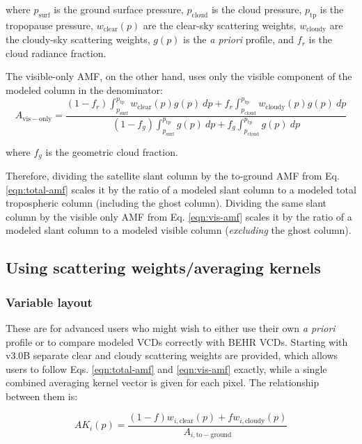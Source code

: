 \documentclass[12pt]{article}
\begin{document}
	where $p_{\mathrm{surf}}$ is the ground surface pressure, $p_{\mathrm{cloud}}$ is the cloud pressure, $p_{\mathrm{tp}}$ is the tropopause pressure, $w_{\mathrm{clear}}(p)$ are the clear-sky scattering weights, $w_{\mathrm{cloudy}}$ are the cloudy-sky scattering weights, $g(p)$ is the \emph{a priori}  profile, and $f_r$ is the cloud radiance fraction.	
	
	The visible-only AMF, on the other hand, uses only the visible component of the modeled column in the denominator:
	\begin{equation}\label{eqn:vis-amf}
	A_{\mathrm{vis-only}} = \frac{(1-f_r) \int_{p_{\mathrm{surf}}}^{p_{\mathrm{tp}}} w_{\mathrm{clear}}(p) g(p) \: dp + f_r \int_{p_{\mathrm{cloud}}}^{p_{\mathrm{tp}}} w_{\mathrm{cloudy}}(p) g(p) \: dp}%
{(1-f_g)\int_{p_{\mathrm{surf}}}^{p_\mathrm{tp}} g(p) \: dp + f_g \int_{p_{\mathrm{cloud}}}^{p_\mathrm{tp}} g(p) \: dp}
	\end{equation}
	
	where $f_g$ is the geometric cloud fraction. 
	
	Therefore, dividing the satellite slant column by the to-ground AMF from Eq. \eqref{eqn:total-amf} scales it by the ratio of a modeled slant column to a modeled total tropospheric column (including the ghost column). Dividing the same slant column by the visible only AMF from Eq. \eqref{eqn:vis-amf} scales it by the ratio of a modeled slant column to a modeled visible column (\emph{excluding} the ghost column).

	
	\subsection{Using scattering weights/averaging kernels} \label{sec:scweights}
	\subsubsection{Variable layout}
	These are for advanced users who might wish to either use their own \emph{a priori}  profile or to compare modeled  VCDs correctly with BEHR VCDs.  Starting with v3.0B separate clear and cloudy scattering weights are provided, which allows users to follow Eqs. \eqref{eqn:total-amf} and \eqref{eqn:vis-amf} exactly, while a single combined averaging kernel vector is given for each pixel. The relationship between them is:
	
	\begin{equation}
	AK_i(p) = \frac{(1-f)w_{i,\mathrm{clear}}(p) + f w_{i,\mathrm{cloudy}}(p)}{A_{i,\mathrm{to-ground}}}
	\end{equation}
	
\end{document}
